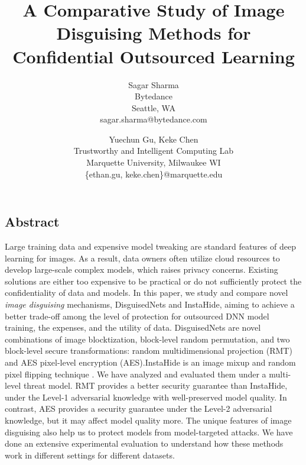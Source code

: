 \documentclass[conference]{IEEEtran}
\begin{document}
\title{A Comparative Study of Image Disguising Methods for Confidential Outsourced Learning}

\author{
{\rm Sagar Sharma}\\
Bytedance\\
Seattle, WA\\
sagar.sharma@bytedance.com
\and
{\rm Yuechun Gu, Keke Chen}\\
Trustworthy and Intelligent Computing Lab\\
Marquette University, Milwaukee WI\\
\{ethan.gu, keke.chen\}@marquette.edu%
} %

\maketitle
\subsection*{Abstract}
Large training data and expensive model tweaking are standard features of deep learning for images. As a result, data owners often utilize cloud resources to develop large-scale complex models, which raises privacy concerns. Existing solutions are either too expensive to be practical or do not sufficiently protect the confidentiality of data and models. In this paper, we study and compare novel \emph{image disguising} mechanisms, DisguisedNets and InstaHide, aiming to achieve a better trade-off among the level of protection for outsourced DNN model training, the expenses, and the utility of data. DisguisedNets are novel combinations of image blocktization, block-level random permutation, and two block-level secure transformations: random multidimensional projection (RMT) and AES pixel-level encryption (AES).InstaHide is an image mixup and random pixel flipping technique \cite{huang20}. We have analyzed and evaluated them under a multi-level threat model. RMT provides a better security guarantee than InstaHide, under the Level-1 adversarial knowledge with well-preserved model quality.
In contrast, AES provides a security guarantee under the Level-2 adversarial knowledge, but it may affect model quality more. The unique features of image disguising also help us to protect models from model-targeted attacks. We have done an extensive experimental evaluation to understand how these methods work in different settings for different datasets. 
\end{document}
